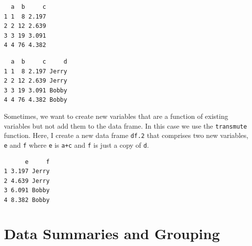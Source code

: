 \documentclass[]{krantz}
\makeatletter
\newenvironment{Shaded}{\begin{snugshade}}{\end{snugshade}}
\newcommand{\DataTypeTok}[1]{\textcolor[rgb]{0.27,0.27,0.27}{#1}}
\newcommand{\FloatTok}[1]{\textcolor[rgb]{0.06,0.06,0.06}{#1}}
\newcommand{\KeywordTok}[1]{\textcolor[rgb]{0.27,0.27,0.27}{\textbf{#1}}}
\newcommand{\NormalTok}[1]{#1}
\newcommand{\OperatorTok}[1]{\textcolor[rgb]{0.43,0.43,0.43}{\textbf{#1}}}
\newcommand{\StringTok}[1]{\textcolor[rgb]{0.5,0.5,0.5}{#1}}
\newenvironment{kframe}{%
\medskip{}
\setlength{\fboxsep}{.8em}
 \def\at@end@of@kframe{}%
 \ifinner\ifhmode%
  \def\at@end@of@kframe{\end{minipage}}%
  \begin{minipage}{\columnwidth}%
 \fi\fi%
 \def\FrameCommand##1{\hskip\@totalleftmargin \hskip-\fboxsep
 \colorbox{shadecolor}{##1}\hskip-\fboxsep
     \hskip-\linewidth \hskip-\@totalleftmargin \hskip\columnwidth}%
 \MakeFramed {\advance\hsize-\width
   \@totalleftmargin\z@ \linewidth\hsize
   \@setminipage}}%
 {\par\unskip\endMakeFramed%
 \at@end@of@kframe}
\renewenvironment{Shaded}{\begin{kframe}}{\end{kframe}}
\makeatother
\begin{document}
\begin{verbatim}
  a  b     c
1 1  8 2.197
2 2 12 2.639
3 3 19 3.091
4 4 76 4.382
\end{verbatim}

\begin{Shaded}
\end{Shaded}

\begin{verbatim}
  a  b     c     d
1 1  8 2.197 Jerry
2 2 12 2.639 Jerry
3 3 19 3.091 Bobby
4 4 76 4.382 Bobby
\end{verbatim}

Sometimes, we want to create new variables that are a function of existing variables but not add them to the data frame. In this case we use the \texttt{transmute} function. Here, I create a new data frame \texttt{df.2} that comprises two new variables, \texttt{e} and \texttt{f} where \texttt{e} is \texttt{a+c} and \texttt{f} is just a copy of \texttt{d}.

\begin{Shaded}
\end{Shaded}

\begin{verbatim}
      e     f
1 3.197 Jerry
2 4.639 Jerry
3 6.091 Bobby
4 8.382 Bobby
\end{verbatim}

\hypertarget{data-summaries-and-grouping}{%
\section{Data Summaries and Grouping}\label{data-summaries-and-grouping}}
\end{document}
